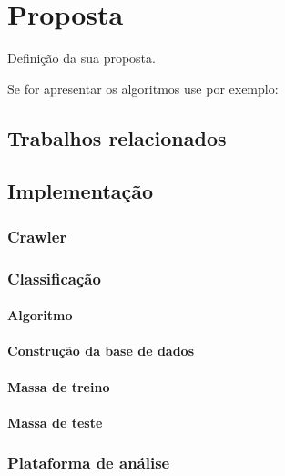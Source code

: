 \chapter{Proposta} \label{cap:proposta}

Definição da sua proposta.

Se for apresentar os algoritmos
use por exemplo:

\section{Trabalhos relacionados}\label{sec:trabalhos_relacionados}

\section{Implementação}\label{sec:implementacao}


\subsection{Crawler}


\subsection{Classificação}


\subsubsection{Algoritmo}


\subsubsection{Construção da base de dados}


\subsubsection{Massa de treino}


\subsubsection{Massa de teste}


\subsection{Plataforma de análise}
